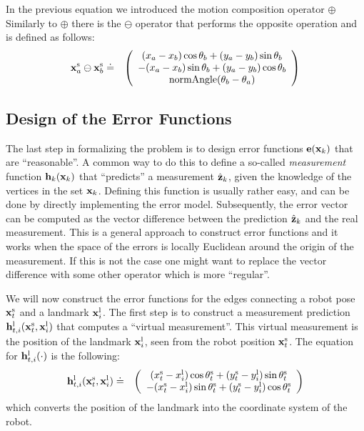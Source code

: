 \documentclass[a4paper]{article}
\begin{document}
In  the previous equation we introduced the motion composition operator $\oplus$
Similarly to $\oplus$ there is the $\ominus$ operator that performs the opposite operation
and is defined as follows:
\begin{eqnarray}
    \mathbf{x}^\mathrm{s}_a \ominus \mathbf{x}^\mathrm{s}_b   & \doteq &
    \left(
    \begin{array}{c}
        (x_a - x_b)  \cos \theta_b + (y_a - y_b) \sin \theta_b \\
      - (x_a - x_b)  \sin \theta_b + (y_a - y_b) \cos \theta_b \\
      \mathrm{normAngle}(\theta_b - \theta_a)
    \end{array}
    \right)
\end{eqnarray}

\subsection{Design of the Error Functions}
The last step in formalizing the problem is to design error functions
$\mathbf{e}(\mathbf{x}_k)$ that are ``reasonable''. A common way to do this to define a
so-called \emph{measurement} function $\mathbf{h}_k(\mathbf{x}_k)$ that ``predicts''
a measurement $\hat {\mathbf{z}}_k$, given the knowledge of the vertices in the
set $\mathbf{x}_k$. Defining this function is usually rather easy, and can be
done by directly implementing the error model. Subsequently, the error
vector can be computed as the vector difference between the prediction
$\hat {\mathbf{z}}_k$ and the real measurement.  This is a general approach to
construct error functions and it works when the space of the errors is
locally Euclidean around the origin of the measurement. If this is not
the case one might want to replace the vector difference with some
other operator which is more ``regular''.

We will now construct the error functions for the edges connecting a
robot pose $\mathbf{x}^\mathrm{s}_t$ and a landmark $\mathbf{x}^\mathrm{l}_i$.  The
first step is to construct a measurement prediction
$\mathbf{h}^\mathrm{l}_{t,i}(\mathbf{x}^\mathrm{s}_t, \mathbf{x}^\mathrm{l}_i)$ that computes
a ``virtual measurement''. This virtual measurement is the position of
the landmark $\mathbf{x}^\mathrm{l}_i$, seen from the robot position
$\mathbf{x}^\mathrm{s}_t$. The equation for $\mathbf{h}^\mathrm{l}_{t,i}(\cdot)$ is the
following:
\begin{eqnarray}
    \mathbf{h}^\mathrm{l}_{t,i}(\mathbf{x}^\mathrm{s}_t, \mathbf{x}^\mathrm{l}_i)   & \doteq &
    \left(
    \begin{array}{c}
        (x^\mathrm{s}_t - x^\mathrm{l}_i)  \cos \theta^\mathrm{s}_t + (y^\mathrm{s}_t - y^\mathrm{l}_i) \sin \theta^\mathrm{s}_t \\
      - (x^\mathrm{s}_t - x^\mathrm{l}_i)  \sin \theta^\mathrm{s}_t + (y^\mathrm{s}_t - y^\mathrm{l}_i) \cos \theta^\mathrm{s}_t
    \end{array}
    \right)
\end{eqnarray}
which converts the position of the landmark into the coordinate system of
the robot.
\end{document}

